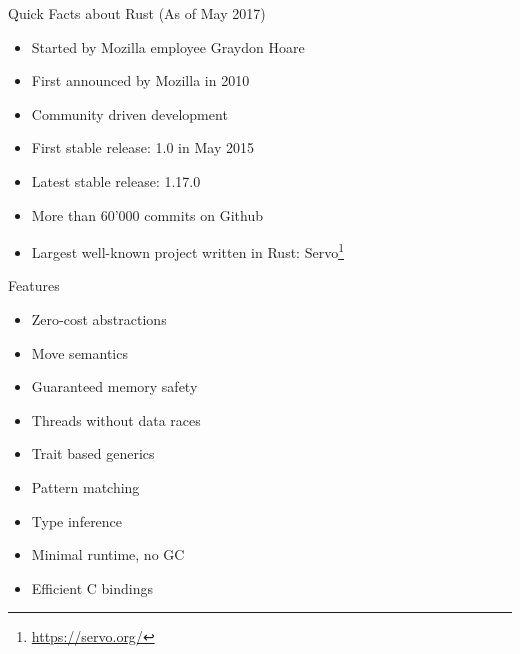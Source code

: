 
\begin{frame}{Quick Facts about Rust}
	(As of May 2017)
	\begin{itemize}
		\item Started by Mozilla employee Graydon Hoare
		\item First announced by Mozilla in 2010
		\item Community driven development
		\item First stable release: 1.0 in May 2015
		\item Latest stable release: 1.17.0
		\item More than 60'000 commits on Github
		\item Largest well-known project written in Rust: Servo\footnote{\url{https://servo.org/}}
	\end{itemize}
\end{frame}


\begin{frame}{Features}
	\begin{itemize}
		\item Zero-cost abstractions
		\item Move semantics
		\item Guaranteed memory safety
		\item Threads without data races
		\item Trait based generics
		\item Pattern matching
		\item Type inference
		\item Minimal runtime, no GC
		\item Efficient C bindings
	\end{itemize}
\end{frame}
